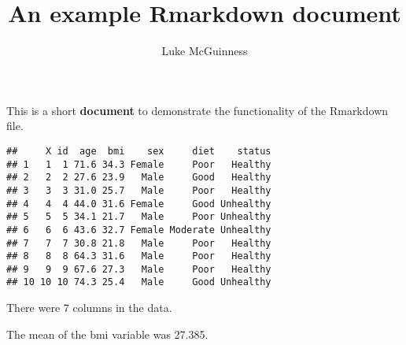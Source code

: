 \documentclass[
]{article}
\title{An example Rmarkdown document}
\author{Luke McGuinness}
\date{}
\begin{document}
\maketitle

This is a short \textbf{document} to demonstrate the functionality of
the Rmarkdown file.

\begin{verbatim}
##     X id  age  bmi    sex     diet    status
## 1   1  1 71.6 34.3 Female     Poor   Healthy
## 2   2  2 27.6 23.9   Male     Good   Healthy
## 3   3  3 31.0 25.7   Male     Poor   Healthy
## 4   4  4 44.0 31.6 Female     Good Unhealthy
## 5   5  5 34.1 21.7   Male     Poor Unhealthy
## 6   6  6 43.6 32.7 Female Moderate Unhealthy
## 7   7  7 30.8 21.8   Male     Poor   Healthy
## 8   8  8 64.3 31.6   Male     Poor   Healthy
## 9   9  9 67.6 27.3   Male     Poor   Healthy
## 10 10 10 74.3 25.4   Male     Good Unhealthy
\end{verbatim}

There were 7 columns in the data.

The mean of the bmi variable was 27.385.
\end{document}
